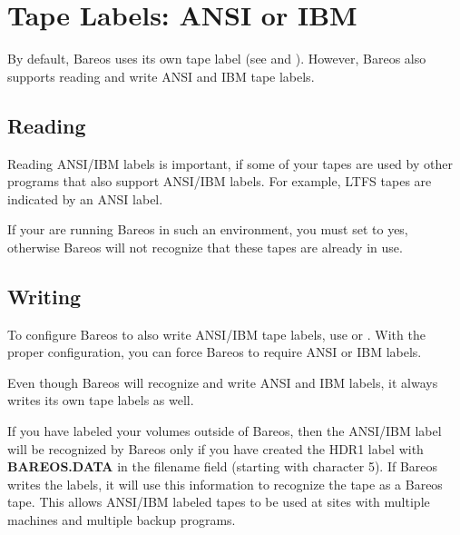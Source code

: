 
\section{Tape Labels: ANSI or IBM}
\label{AnsiLabelsChapter}

By default, Bareos uses its own tape label (see  and ).
However, Bareos also supports reading and write ANSI and IBM tape labels.

\subsection{Reading}

Reading ANSI/IBM labels is important,
if some of your tapes are used by other programs that also support ANSI/IBM labels.
For example, LTFS tapes 
are indicated by an ANSI label.

If your are running Bareos in such an environment,
you must set  to yes,
otherwise Bareos will not recognize that these tapes are already in use.

\subsection{Writing}

To configure Bareos to also write ANSI/IBM tape labels,
use 
 or .
With the proper configuration, you can
force Bareos to require ANSI or IBM labels.

Even though Bareos will recognize and write ANSI and IBM labels,
it always writes its own tape labels as well.

If you have labeled your volumes outside of Bareos, then the
ANSI/IBM label will be recognized by Bareos only if you have created
the HDR1 label with {\bf BAREOS.DATA} in the filename field (starting
with character 5).  If Bareos writes the labels, it will use
this information to recognize the tape as a Bareos tape.  This allows
ANSI/IBM labeled tapes to be used at sites with multiple machines
and multiple backup programs.
